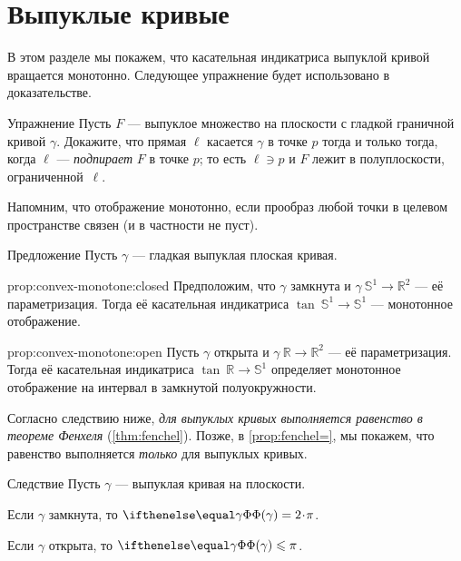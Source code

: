 \section{Выпуклые кривые}

В этом разделе мы покажем, что касательная индикатриса выпуклой кривой вращается монотонно.
Следующее упражнение будет использовано в доказательстве.

\begin{thm}{Упражнение}\label{ex:tangent-support}
Пусть $F$ --- выпуклое множество на плоскости с гладкой граничной кривой $\gamma$.
Докажите, что прямая $\ell$ касается $\gamma$ в точке $p$ тогда и только тогда, когда $\ell$ --- \emph{подпирает} $F$ в точке $p$;
то есть $\ell\ni p$ и $F$ лежит в полуплоскости, ограниченной~$\ell$.
\end{thm}

Напомним, что отображение монотонно, если прообраз любой точки в целевом пространстве связен (и в частности не пуст).

\begin{thm}{Предложение}\label{prop:convex-monotone}
Пусть $\gamma$ --- гладкая выпуклая плоская кривая.

\begin{subthm}{prop:convex-monotone:closed}
Предположим, что $\gamma$ замкнута и $\gamma\:\mathbb{S}^1\to \mathbb{R}^2$ --- её параметризация.
Тогда её касательная индикатриса $\tan\:\mathbb{S}^1\to \mathbb{S}^1$ --- монотонное отображение.
\end{subthm}

\begin{subthm}{prop:convex-monotone:open}
Пусть $\gamma$ открыта и $\gamma\:\mathbb{R}\to \mathbb{R}^2$ --- её параметризация.
Тогда её касательная индикатриса $\tan\:\mathbb{R}\to\mathbb{S}^1$ определяет монотонное отображение на интервал в замкнутой полуокружности.
\end{subthm}

\end{thm}

Согласно следствию ниже, \textit{для выпуклых кривых выполняется равенство в теореме Фенхеля} (\ref{thm:fenchel}).
Позже, в \ref{prop:fenchel=}, мы покажем, что равенство выполняется \textit{только} для выпуклых кривых.

\begin{thm}{Следствие}\label{cor:fenchel=convex}
Пусть $\gamma$ --- выпуклая кривая на плоскости.

\begin{subthm}{}
Если $\gamma$ замкнута, то $\tc\gamma=2\cdot\pi$.
\end{subthm}

\begin{subthm}{}
Если $\gamma$ открыта, то $\tc\gamma\le\pi$.
\end{subthm}

\end{thm}


